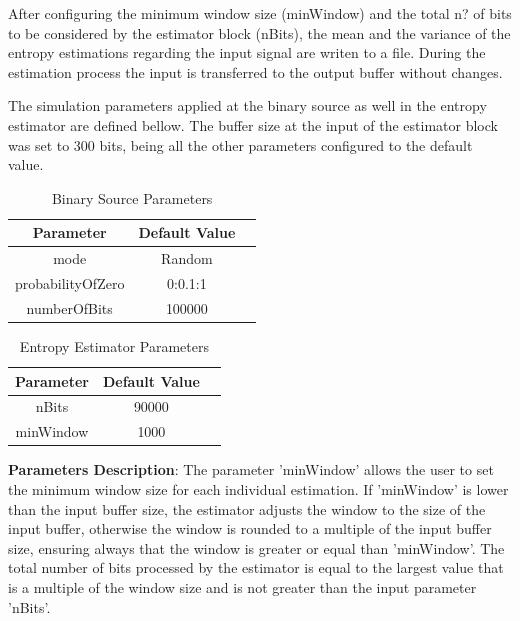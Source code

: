 \begin{refsection}
After configuring the minimum window size (minWindow) and the total n? of bits to be considered by the estimator block 
(nBits), the mean and the variance of the entropy estimations regarding the input signal are writen to a file. During the
estimation process the input is transferred to the output buffer without changes.  

The simulation parameters applied at the binary source as well in the entropy estimator are defined bellow. The buffer size at the input of the estimator block was set to 
300 bits, being all the other parameters configured to the default value.

\begin{table}[H]
\centering
\label{tb:paramsource}
\begin{tabular}{|c|c|c|}
\hline
\textbf{Parameter}                      & \textbf{Default Value}                                       \\ \hline
mode                          			& Random                                                       \\ \hline
probabilityOfZero                		& 0:0.1:1                                                      \\ \hline
numberOfBits                          	& 100000                                                       \\ \hline

\end{tabular}
\caption{Binary Source Parameters}
\end{table}


\begin{table}[H]
\centering
\label{tb:paramestimator}
\begin{tabular}{|c|c|c|}
\hline
\textbf{Parameter}                      & \textbf{Default Value}                                        \\ \hline
nBits                          			& 90000                                                         \\ \hline
minWindow                				& 1000                                                      	\\ \hline

\end{tabular}
\caption{Entropy Estimator Parameters}
\end{table}

\textbf{Parameters Description}: The parameter 'minWindow' allows the user to set the 
minimum window size for each individual estimation. If 'minWindow' is lower than the 
input buffer size, the estimator adjusts the window to the size of the input buffer, 
otherwise the window is rounded to a multiple of the input buffer size, ensuring always 
that the window is greater or equal than 'minWindow'. The total number of bits processed 
by the estimator is equal to the largest value that is a multiple of the window size and 
is not greater than the input parameter 'nBits'.


\end{refsection}

